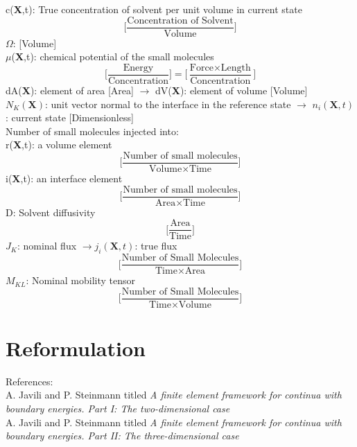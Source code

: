 \documentclass[12pt,3p]{article}
\numberwithin{equation}{section}
\begin{document}
c(\textbf{X},t): True concentration of solvent per unit volume in current state \\
\begin{equation*}
\bigg[ \frac{\text{Concentration of Solvent}}{\text{Volume}} \bigg] 
\end{equation*}
$\Omega$: [Volume] \\
$\mu$(\textbf{X},t): chemical potential of the small molecules 
\begin{equation*}
\bigg[ \frac{\text{Energy}}{\text{Concentration}} \bigg] = \bigg[ \frac{\text{Force} \times \text{Length}}{\text{Concentration}} \bigg] 
\end{equation*}
dA(\textbf{X}): element of area [Area] $\rightarrow$ dV(\textbf{X}): element of volume [Volume] \\
$N_K (\textbf{X})$: unit vector normal to the interface in the reference state $\rightarrow$ $n_i (\textbf{X}, t)$: current state [Dimensionless] \\
Number of small molecules injected into: \\
	\indent r(\textbf{X},t): a volume element 
	\begin{equation*}
	\bigg[ \frac{\text{Number of small molecules}}{\text{Volume} \times \text{Time}} \bigg] 
	\end{equation*}
	\indent i(\textbf{X},t): an interface element 
	\begin{equation*}
	\bigg[ \frac{\text{Number of small molecules}}{\text{Area} \times \text{Time}} \bigg] 
	\end{equation*}
D: Solvent diffusivity 
\begin{equation*}
\bigg[ \frac{\text{Area}}{\text{Time}} \bigg]
\end{equation*}
$J_K$: nominal flux $\rightarrow j_i(\mathbf{X},t)$: true flux 
\begin{equation*}
\bigg[ \frac{\text{Number of Small Molecules}}{\text{Time} \times \text{Area}} \bigg] 
\end{equation*}
$M_{KL}$: Nominal mobility tensor
\begin{equation*}
\bigg[ \frac{\text{Number of Small Molecules}}{\text{Time} \times \text{Volume}} \bigg]
\end{equation*}

\newpage

\section{Reformulation}
References: \\
A. Javili and P. Steinmann titled \textit{A finite element framework for continua with boundary energies. Part I: The two-dimensional case} \\
A. Javili and P. Steinmann titled \textit{A finite element framework for continua with boundary energies. Part II: The three-dimensional case} 
\end{document}
